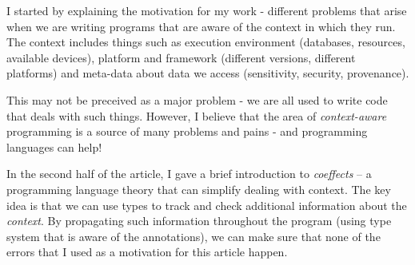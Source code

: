 I started by explaining the
motivation for my work - different problems that arise when we are writing programs that are
aware of the context in which they run. The context includes things such as execution environment
(databases, resources, available devices), platform and framework (different versions, different
platforms) and meta-data about data we access (sensitivity, security, provenance). 

This may not be preceived as a major problem - we are all used to write code that deals with
such things. However, I believe that the area of \emph{context-aware} programming is a source of
many problems and pains - and programming languages can help!

In the second half of the article, I gave a brief introduction to \emph{coeffects} -- a programming
language theory that can simplify dealing with context.
The key idea is that we can use types to track and check additional information about
the \emph{context}. By propagating such information throughout the program (using type system
that is aware of the annotations), we can make sure that none of the errors that I used
as a motivation for this article happen. 
